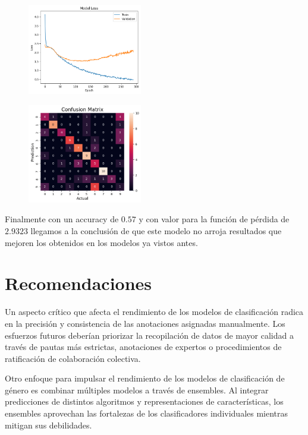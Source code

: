 \documentclass[colorinlistoftodos,twoside,twocolumn,10pt]{article} %
\begin{document}
\begin{figure}[h!]
	\includegraphics[width=5cm]{vl_loss.png}
\end{figure}


\begin{figure}[h!]
	\includegraphics[width=5cm]{vl_confussion_matrix.png}
\end{figure}

Finalmente con un accuracy de $0.57$ y con valor para la funci\'on de p\'erdida de  $2.9323$ llegamos a la conclusi\'on de que este modelo no arroja resultados que mejoren los obtenidos en los modelos ya vistos antes.

	\section{Recomendaciones}
  
Un aspecto crítico que afecta el rendimiento de los modelos de clasificación radica en la precisión y consistencia de las anotaciones asignadas manualmente. Los esfuerzos futuros deberían priorizar la recopilación de datos de mayor calidad a través de pautas más estrictas, anotaciones de expertos o procedimientos de ratificación de colaboración colectiva.

Otro enfoque para impulsar el rendimiento de los modelos de clasificación de género es combinar múltiples modelos a través de ensembles. Al integrar predicciones de distintos algoritmos y representaciones de características, los ensembles aprovechan las fortalezas de los clasificadores individuales mientras mitigan sus debilidades.  
\end{document}
